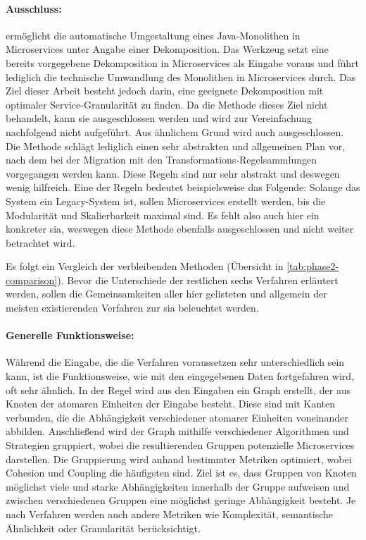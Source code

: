 \paragraph{Ausschluss:}  ermöglicht die automatische Umgestaltung eines Java-Monolithen in Microservices unter Angabe einer Dekomposition.
Das Werkzeug setzt eine bereits vorgegebene Dekomposition in Microservices als Eingabe voraus und führt lediglich die technische Umwandlung des Monolithen in Microservices durch.
Das Ziel dieser Arbeit besteht jedoch darin, eine geeignete Dekomposition mit optimaler Service-Granularität zu finden.
Da die Methode dieses Ziel nicht behandelt, kann sie ausgeschlossen werden und wird zur Vereinfachung nachfolgend nicht aufgeführt.
Aus ähnlichem Grund wird auch  ausgeschlossen.
Die Methode schlägt lediglich einen sehr abstrakten und allgemeinen Plan vor, nach dem bei der Migration mit den Transformations-Regelsammlungen vorgegangen werden kann.
Diese Regeln sind nur sehr abstrakt und deswegen wenig hilfreich.
Eine der Regeln bedeutet beispielsweise das Folgende:
Solange das System ein Legacy-System ist, sollen Microservices erstellt werden, bis die Modularität und Skalierbarkeit maximal sind.
Es fehlt also auch hier ein konkreter \gls{sia}, weswegen diese Methode ebenfalls ausgeschlossen und nicht weiter betrachtet wird.


Es folgt ein Vergleich der verbleibenden Methoden (Übersicht in \cref{tab:phase2-comparison}).%
%
Bevor die Unterschiede der restlichen sechs Verfahren erläutert werden, sollen die Gemeinsamkeiten aller hier gelisteten und allgemein der meisten existierenden Verfahren zur \gls{sia} beleuchtet werden.
\paragraph{Generelle Funktionsweise:} Während die Eingabe, die die Verfahren voraussetzen sehr unterschiedlich sein kann, ist die Funktionsweise, wie mit den eingegebenen Daten fortgefahren wird, oft sehr ähnlich.
In der Regel wird aus den Eingaben ein Graph erstellt, der aus Knoten der atomaren Einheiten der Eingabe besteht.
Diese sind mit Kanten verbunden, die die Abhängigkeit verschiedener atomarer Einheiten voneinander abbilden.
Anschließend wird der Graph mithilfe verschiedener Algorithmen und Strategien gruppiert, wobei die resultierenden Gruppen potenzielle Microservices darstellen.
Die Gruppierung wird anhand bestimmter Metriken optimiert, wobei Cohesion und Coupling die häufigsten sind.
Ziel ist es, dass Gruppen von Knoten möglichst viele und starke Abhängigkeiten innerhalb der Gruppe aufweisen und zwischen verschiedenen Gruppen eine möglichst geringe Abhängigkeit besteht.
Je nach Verfahren werden auch andere Metriken wie Komplexität, semantische Ähnlichkeit oder Granularität berücksichtigt.

